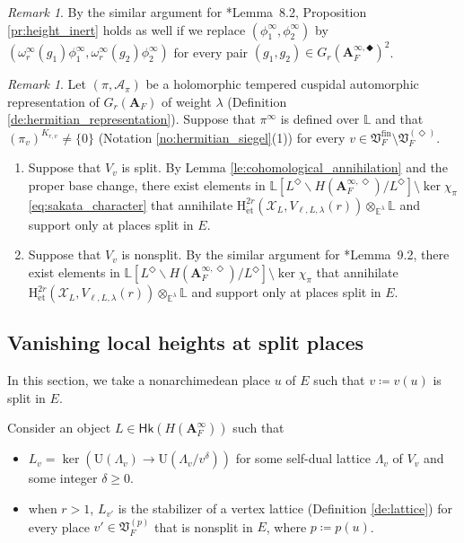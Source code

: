 \documentclass[12pt]{amsart}
\numberwithin{equation}{section}
\theoremstyle{plain}
\theoremstyle{definition}
\theoremstyle{remark}
\newtheorem{remark}[proposition]{Remark}
\renewcommand{\b}[1]{\mathbf{#1}}
\renewcommand{\c}[1]{\mathcal{#1}}
\renewcommand{\d}[1]{\mathbb{#1}}
\newcommand{\f}[1]{\mathfrak{#1}}
\renewcommand{\r}[1]{\mathrm{#1}}
\renewcommand{\sf}[1]{\mathsf{#1}}
\renewcommand{\(}{\left(}
\renewcommand{\)}{\right)}
\renewcommand{\geq}{\geqslant}
\newcommand{\bA}{\b A}
\newcommand{\cA}{\c A}
\newcommand{\cX}{\c X}
\newcommand{\dE}{\d E}
\newcommand{\dL}{\d L}
\newcommand{\fV}{\f V}
\newcommand{\rH}{\r H}
\newcommand{\rU}{\r U}
\newcommand{\et}{{\acute{\r{e}}\r{t}}}
\newcommand{\fin}{\r{fin}}
\newcommand{\Hk}{\sf{Hk}}
\DeclareMathOperator{\Ker}{ker}
\begin{document}
\begin{remark}\label{re:height_inert}
By the similar argument for \cite{LL21}*{Lemma~8.2}, Proposition \ref{pr:height_inert} holds as well if we replace $(\phi^\infty_1,\phi^\infty_2)$ by $(\omega_r^\infty(g_1)\phi^\infty_1,\omega_r^\infty(g_2)\phi^\infty_2)$ for every pair $(g_1,g_2)\in G_r(\bA_F^{\infty,\Diamondblack})^2$.
\end{remark}



\begin{remark}
Let $(\pi,\cA_\pi)$ be a holomorphic tempered cuspidal automorphic representation of $G_r(\bA_F)$ of weight $\lambda$ (Definition \ref{de:hermitian_representation}). Suppose that $\pi^\infty$ is defined over $\dL$ and that $(\pi_v)^{K_{r,v}}\neq\{0\}$ (Notation \ref{no:hermitian_siegel}(1)) for every $v\in\fV_F^\fin\setminus\fV_F^{(\Diamond)}$.
\begin{enumerate}
  \item Suppose that $V_v$ is split. By Lemma \ref{le:cohomological_annihilation} and the proper base change, there exist elements in $\dL[L^\Diamond\backslash H(\bA_F^{\infty,\Diamond})/L^\Diamond]\setminus\Ker\chi_\pi$ \eqref{eq:sakata_character} that annihilate $\rH^{2r}_{\et}(\cX_L,V_{\ell,L,\lambda}(r))\otimes_{\dE^\lambda}\dL$ and support only at places split in $E$.

  \item Suppose that $V_v$ is nonsplit. By the similar argument for \cite{LL21}*{Lemma~9.2}, there exist elements in $\dL[L^\Diamond\backslash H(\bA_F^{\infty,\Diamond})/L^\Diamond]\setminus\Ker\chi_\pi$ that annihilate $\rH^{2r}_{\et}(\cX_L,V_{\ell,L,\lambda}(r))\otimes_{\dE^\lambda}\dL$ and support only at places split in $E$.
\end{enumerate}
\end{remark}


\subsection{Vanishing local heights at split places}
\label{ss:height_split}

In this section, we take a nonarchimedean place $u$ of $E$ such that $v\coloneqq v(u)$ is split in $E$.

Consider an object $L\in\Hk(H(\bA_F^\infty))$ such that
\begin{itemize}
  \item $L_v=\Ker\(\rU(\Lambda_v)\to\rU(\Lambda_v/v^\delta)\)$ for some self-dual lattice $\Lambda_v$ of $V_v$ and some integer $\delta\geq 0$.

  \item when $r>1$, $L_{v'}$ is the stabilizer of a vertex lattice (Definition \ref{de:lattice}) for every place $v'\in\fV_F^{(p)}$ that is nonsplit in $E$, where $p\coloneqq p(u)$.
\end{itemize}
\end{document}
